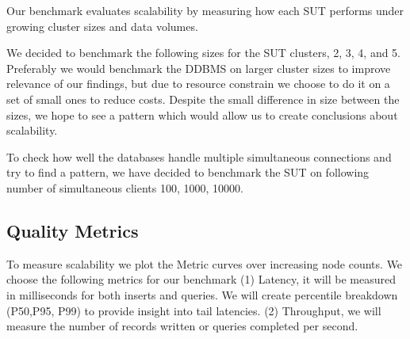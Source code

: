 Our benchmark evaluates scalability by measuring how each SUT performs under growing cluster sizes and data volumes.

We decided to benchmark the following sizes for the SUT clusters, 2, 3, 4, and 5.
Preferably we would benchmark the DDBMS on larger cluster sizes to improve relevance of our findings, but due to resource constrain we choose to do it on a set of small ones to reduce costs.
Despite the small difference in size between the sizes, we hope to see a pattern which would allow us to create conclusions about scalability.

To check how well the databases handle multiple simultaneous connections and try to find a pattern, we have decided to benchmark the SUT on following number of simultaneous clients 100, 1000, 10000.

%
%
%
\subsection{Quality Metrics}
To measure scalability we plot the Metric curves over increasing node counts.
We choose the following metrics for our benchmark
(1) Latency, it will be measured in milliseconds for both inserts and queries. We will create percentile breakdown (P50,P95, P99) to provide insight into tail latencies.
(2) Throughput, we will measure the number of records written or queries completed per second.


